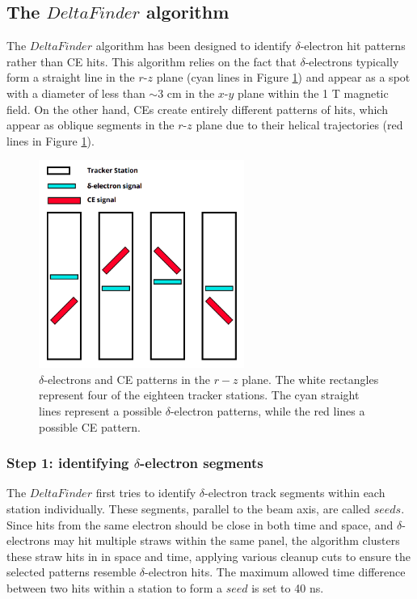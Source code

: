 \subsection{The $DeltaFinder$ algorithm}\label{deltafinder}

The $DeltaFinder$ algorithm has been designed 
to identify $\delta$-electron 
hit patterns rather than CE hits. This 
algorithm relies on the 
fact that $\delta$-electrons typically 
form a straight line in 
the $r$-$z$ plane (cyan lines in Figure 
\ref{fig:yzviewdelta}) 
and appear as a spot with a diameter 
of less than $\sim$3 cm in the 
$x$-$y$ plane within the 1 T  
magnetic field. On the other hand, 
CEs create entirely different 
patterns of hits, which appear as oblique segments in 
the $r$-$z$ plane due to their 
helical trajectories (red lines 
in Figure \ref{fig:yzviewdelta}). 
\begin{figure}[!h]
    \centering
    \includegraphics[width =0.6\textwidth]{figures/png/Screenshot_20240811_123048.png}
    \caption[$\delta$-electrons and CE patterns in $r-z$ plane.]{
        $\delta$-electrons and CE patterns in the $r-z$ plane. 
        The white rectangles represent four of the eighteen tracker stations. 
        The cyan straight lines represent a possible $\delta$-electron 
        patterns, while the red lines a possible CE pattern.
        }
    \label{fig:yzviewdelta}
\end{figure}
\subsubsection{Step 1: identifying $\delta$-electron segments}
The $DeltaFinder$ first tries to 
identify $\delta$-electron track 
segments within each station 
individually. These segments, 
parallel to the beam axis, are 
called $seeds$. Since hits 
from the same electron should be 
close in both time and space, 
and $\delta$-electrons may hit 
multiple straws within the 
same panel, the algorithm clusters 
these straw hits in 
in space and time, applying various 
cleanup cuts to ensure the 
selected patterns resemble 
$\delta$-electron hits. 
The maximum allowed time 
difference between two hits within 
a station to form a $seed$ is set to 40 ns.

